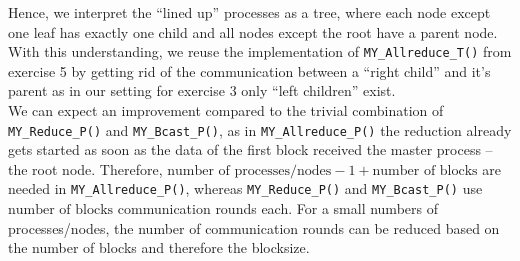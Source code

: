Hence, we interpret the “lined up” processes as a tree, where each node except one leaf has exactly 
one child and all nodes except the root have a parent node. With this understanding, we reuse the 
implementation of \texttt{MY\_Allreduce\_T()} from exercise 5 by getting rid of the communication between 
a “right child” and it’s parent as in our setting for exercise 3 only “left children” exist.\\

We can expect an improvement compared to the trivial combination of \texttt{MY\_Reduce\_P()} and 
\texttt{MY\_Bcast\_P()}, as in \texttt{MY\_Allreduce\_P()} the reduction already gets started as soon 
as the data of the first block received the master process -- the root node. Therefore, 
$\text{number of processes/nodes} - 1 + \text{number of blocks}$ are needed in \texttt{MY\_Allreduce\_P()}, 
whereas \texttt{MY\_Reduce\_P()} and \texttt{MY\_Bcast\_P()} use $\text{number of blocks}$ communication rounds 
each. For a small numbers of processes/nodes, the number of communication rounds can be reduced based 
on the number of blocks and therefore the blocksize.\\

\pagebreak

